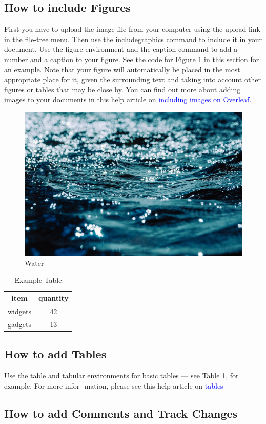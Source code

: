 \documentclass{article}
\begin{document}
	\subsection{How to include Figures}
	First you have to upload the image file from your computer using the upload link in the file-tree menu.
	Then use the includegraphics command to include it in your document. Use the figure environment
	and the caption command to add a number and a caption to your figure. See the code for Figure 1 in
	this section for an example.
	Note that your figure will automatically be placed in the most appropriate place for it, given the
	surrounding text and taking into account other figures or tables that may be close by. You can find
	out more about adding images to your documents in this help article on \textcolor{blue}{including images on Overleaf.}
	\begin{figure}
		\begin{center}
			\includegraphics[width=0.6 \linewidth]{img.jpg}
		\end{center}
      \caption{Water}
	\end{figure}

    \begin{table}[h]
    	
   \begin{center}
    \begin{tabular}{|c|c|}
    	\hline
    	  \textbf{item} & 
    	  \textbf{quantity} \\
    	\hline 
    	widgets & 42 \\
    	\hline 
    	gadgets & 13\\
    	\hline
    \end{tabular}
    	\end{center}
        \caption{Example Table}
    \end{table}

  \subsection{How to add Tables}
  Use the table and tabular environments for basic tables — see Table 1, for example. For more infor-
  mation, please see this help article on \textcolor{blue}{tables}
  \subsection{How to add Comments and Track Changes}
\end{document}
